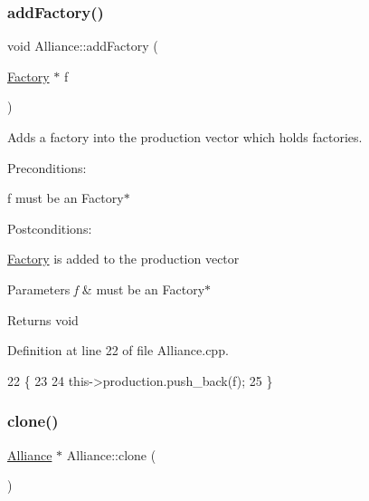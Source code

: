 \subsubsection{\texorpdfstring{add\+Factory()}{addFactory()}}
{\footnotesize\ttfamily void Alliance\+::add\+Factory (\begin{DoxyParamCaption}\item[{\hyperlink{classFactory}{Factory} $\ast$}]{f }\end{DoxyParamCaption})}



Adds a factory into the production vector which holds factories. 

Preconditions\+:
\begin{DoxyItemize}
\item f must be an Factory$\ast$
\end{DoxyItemize}

Postconditions\+:
\begin{DoxyItemize}
\item \hyperlink{classFactory}{Factory} is added to the production vector
\end{DoxyItemize}


\begin{DoxyParams}{Parameters}
{\em f} & must be an Factory$\ast$ \\
\hline
\end{DoxyParams}
\begin{DoxyReturn}{Returns}
void 
\end{DoxyReturn}


Definition at line 22 of file Alliance.\+cpp.


\begin{DoxyCode}
22                                     \{
23     
24     this->production.push\_back(f);
25 \}
\end{DoxyCode}
\mbox{\label{classAlliance_adc67a41223565105889493f9cfd350d0}} 
\subsubsection{\texorpdfstring{clone()}{clone()}}
{\footnotesize\ttfamily \hyperlink{classAlliance}{Alliance} $\ast$ Alliance\+::clone (\begin{DoxyParamCaption}{ }\end{DoxyParamCaption})}



